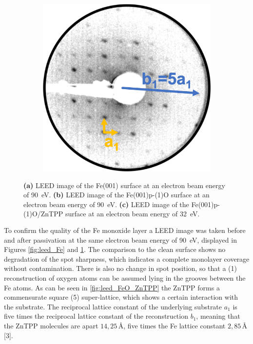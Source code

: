 \begin{figure}[h]
\begin{subfigure}{0.25\textwidth}
        \caption{}
        \label{fig:leed_FeO}
    \end{subfigure}
    \hfill
    \begin{subfigure}{0.25\textwidth}
        \includegraphics[width = \textwidth]{Plots/FeO_ZnTPP.png}
        \caption{}
        \label{fig:leed_FeO_ZnTPP}
    \end{subfigure}
    \caption{\textbf{(a)} LEED image of the Fe(001) surface at an electron beam energy of \qty{90}{eV}. \textbf{(b)} LEED image of the Fe(001)p-(1)O surface at an electron beam energy of \qty{90}{eV}. \textbf{(c)} LEED image of the Fe(001)p-(1)O/ZnTPP surface at an electron beam energy of \qty{32}{eV}.}
    \label{fig:leed_1}
\end{figure}
\FloatBarrier

To confirm the quality of the Fe monoxide layer a LEED image was taken before and after passivation at the same electron beam energy of \qty{90}{eV}, displayed in Figures \ref{fig:leed_Fe} and \ref{fig:leed_FeO}.
The comparison to the clean surface shows no degradation of the spot sharpness, which indicates a complete monolayer coverage without contamination.
There is also no change in spot position, so that a (1) reconstruction of oxygen atoms can be assumed lying in the grooves between the Fe atoms.
As can be seen in \autoref{fig:leed_FeO_ZnTPP} the ZnTPP forms a commensurate square (5) super-lattice, which shows a certain interaction with the substrate.
The reciprocal lattice constant of the underlying substrate $a_1$ is five times the reciprocal lattice constant of the reconstruction $b_1$, meaning that the ZnTPP molecules are apart $14,25\,$\r{A}, five times the Fe lattice constant $2,85\,$\r{A} [3].

